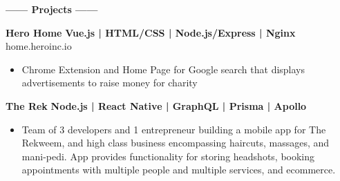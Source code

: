 \documentclass[12pt]{article}
\begin{document}
\colorbox{secondary}{
    \parbox{45em}{
    \color{white}
    \vspace{-2mm}

    \begin{center}
    \textbf{\Large------ Projects ------}\\
    \end{center}
    
    \vspace{-5mm}
    \begin{footnotesize}

    \textbf{\color{primary}\large Hero Home } \hfill \textbf{\color{Cerulean}Vue.js | HTML/CSS | Node.js/Express | Nginx }\\
    {\color{primary}\footnotesize home.heroinc.io}
    \begin{itemize}
        \item Chrome Extension and Home Page for Google search that displays advertisements to raise money for charity
    \end{itemize}


    \flushleft

    \textbf{\color{primary}\large The Rek} \hfill \textbf{\color{Cerulean} Node.js | React Native | GraphQL | Prisma | Apollo}
    \begin{itemize}
        \item Team of 3 developers and 1 entrepreneur building a mobile app for The Rekweem, and high class business encompassing haircuts, massages, and mani-pedi. App provides functionality for storing headshots, booking appointments with multiple people and multiple services, and ecommerce.
    \end{itemize}

    \end{footnotesize}
}}

\end{document}
